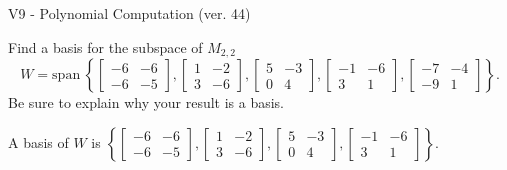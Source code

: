 \begin{exercise}
  \begin{exerciseTitle}V9 - Polynomial Computation (ver. 44)\end{exerciseTitle}
  \begin{exerciseStatement}
    Find a basis for the subspace of \(M_{2,2}\) 
\[W=\mathrm{span}\ \left\{\left[\begin{array}{cc}
-6 & -6 \\
-6 & -5
\end{array}\right] , \left[\begin{array}{cc}
1 & -2 \\
3 & -6
\end{array}\right] , \left[\begin{array}{cc}
5 & -3 \\
0 & 4
\end{array}\right] , \left[\begin{array}{cc}
-1 & -6 \\
3 & 1
\end{array}\right] , \left[\begin{array}{cc}
-7 & -4 \\
-9 & 1
\end{array}\right]\right\}.\]
 Be sure to explain why your result is a basis.


  \end{exerciseStatement}
  \begin{exerciseAnswer}
   A basis of \(W\) is  \(\left\{\left[\begin{array}{cc}
-6 & -6 \\
-6 & -5
\end{array}\right] , \left[\begin{array}{cc}
1 & -2 \\
3 & -6
\end{array}\right] , \left[\begin{array}{cc}
5 & -3 \\
0 & 4
\end{array}\right] , \left[\begin{array}{cc}
-1 & -6 \\
3 & 1
\end{array}\right]\right\}\).
  


  \end{exerciseAnswer}
\end{exercise}